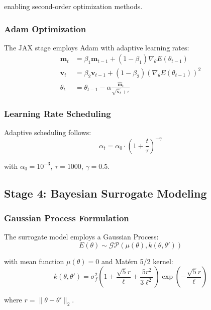 enabling second-order optimization methods.

\subsubsection{Adam Optimization}

The JAX stage employs Adam with adaptive learning rates:
\begin{align}
\mathbf{m}_t &= \beta_1 \mathbf{m}_{t-1} + (1-\beta_1) \nabla_{\theta} E(\theta_{t-1}) \\
\mathbf{v}_t &= \beta_2 \mathbf{v}_{t-1} + (1-\beta_2) (\nabla_{\theta} E(\theta_{t-1}))^2 \\
\theta_t &= \theta_{t-1} - \alpha \frac{\hat{\mathbf{m}}_t}{\sqrt{\hat{\mathbf{v}}_t} + \epsilon}
\end{align}

\subsubsection{Learning Rate Scheduling}

Adaptive scheduling follows:
\begin{equation}
\alpha_t = \alpha_0 \cdot \left(1 + \frac{t}{\tau}\right)^{-\gamma}
\end{equation}

with $\alpha_0 = 10^{-3}$, $\tau = 1000$, $\gamma = 0.5$.

\subsection{Stage 4: Bayesian Surrogate Modeling}

\subsubsection{Gaussian Process Formulation}

The surrogate model employs a Gaussian Process:
\begin{equation}
E(\theta) \sim \mathcal{GP}(\mu(\theta), k(\theta, \theta'))
\end{equation}

with mean function $\mu(\theta) = 0$ and Matérn 5/2 kernel:
\begin{equation}
k(\theta, \theta') = \sigma_f^2 \left(1 + \frac{\sqrt{5}r}{\ell} + \frac{5r^2}{3\ell^2}\right) \exp\left(-\frac{\sqrt{5}r}{\ell}\right)
\end{equation}

where $r = \|\theta - \theta'\|_2$.

